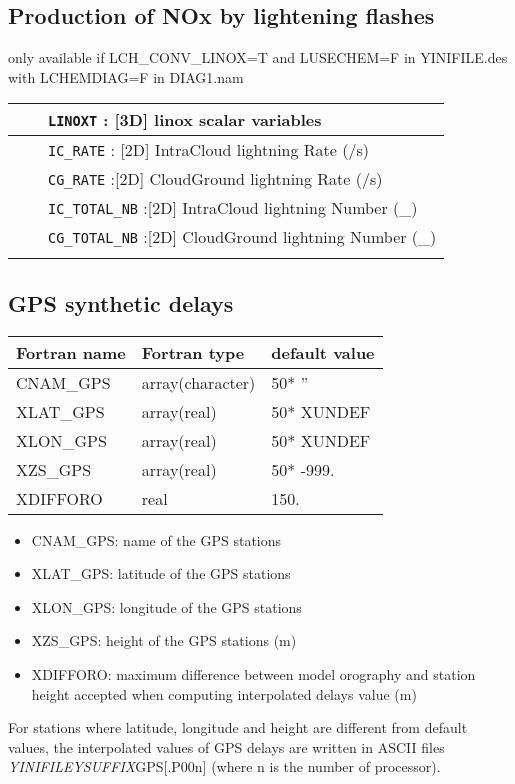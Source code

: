 \subsection{Production of NOx by lightening flashes}
only available if  LCH\_CONV\_LINOX=T and LUSECHEM=F in YINIFILE.des with LCHEMDIAG=F in DIAG1.nam
\begin{center}
\begin{tabular}{>{\centering}p{3cm}>{\centering}p{2.5cm}|p{11cm}|}
\cline{3-3}
&&{\tt LINOXT} : [3D] linox scalar variables\\\cline{3-3}
&&{\tt IC\_RATE} : [2D] IntraCloud lightning Rate   (/s) \\ \cline{3-3}
&&{\tt CG\_RATE} :[2D] CloudGround lightning Rate (/s) \\ \cline{3-3}
&&{\tt IC\_TOTAL\_NB} :[2D] IntraCloud lightning Number (\_)\\ \cline{3-3}
&&{\tt CG\_TOTAL\_NB} :[2D] CloudGround lightning Number (\_) \\ \cline{3-3}
\end{tabular} 
\end{center}

\newpage
\subsection{GPS synthetic delays}
\begin{center}
\begin{tabular} {|l|l|l|}
\hline
Fortran name  & Fortran type & default value \\
\hline
CNAM\_GPS\index{CNAM\_GPS!\innam{NAM\_DIAG}}       & array(character)     & 50* ''     \\
XLAT\_GPS\index{XLAT\_GPS!\innam{NAM\_DIAG}}       & array(real)          & 50* XUNDEF \\
XLON\_GPS \index{XLON\_GPS!\innam{NAM\_DIAG}}      & array(real)          & 50* XUNDEF \\
XZS\_GPS \index{XZS\_GPS!\innam{NAM\_DIAG}}       & array(real)          & 50* -999.  \\
XDIFFORO \index{XDIFFORO!\innam{NAM\_DIAG}}       & real                 & 150.       \\
\hline
\end{tabular}
\end{center}

\begin{itemize}
\item CNAM\_GPS: name of the GPS stations
\item XLAT\_GPS: latitude of the GPS stations
\item XLON\_GPS: longitude of the GPS stations
\item XZS\_GPS: height of the GPS stations (m)
\item XDIFFORO: maximum difference between model orography and station height accepted when computing interpolated delays value (m)
\end{itemize}
For stations where latitude, longitude and height are different from default
values, the interpolated values of GPS delays are written in ASCII files 
{\it YINIFILEYSUFFIX}GPS[.P00n] (where n is the number of processor).  \\

